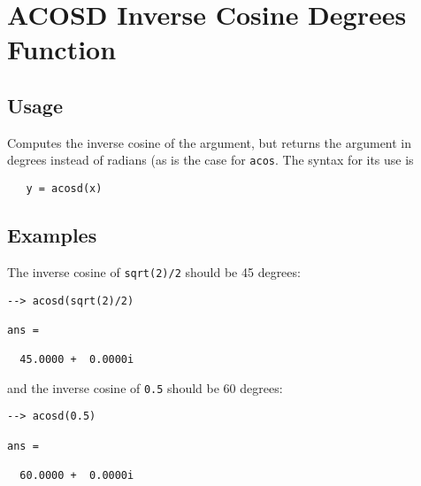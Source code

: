 \section{ACOSD Inverse Cosine Degrees Function}

\subsection{Usage}

Computes the inverse cosine of the argument, but returns
the argument in degrees instead of radians (as is the case
for \verb|acos|. The syntax for its use is
\begin{verbatim}
   y = acosd(x)
\end{verbatim}
\subsection{Examples}

The inverse cosine of \verb|sqrt(2)/2| should be 45 degrees:
\begin{verbatim}
--> acosd(sqrt(2)/2)

ans = 

  45.0000 +  0.0000i 
\end{verbatim}
and the inverse cosine of \verb|0.5| should be 60 degrees:
\begin{verbatim}
--> acosd(0.5)

ans = 

  60.0000 +  0.0000i 
\end{verbatim}
